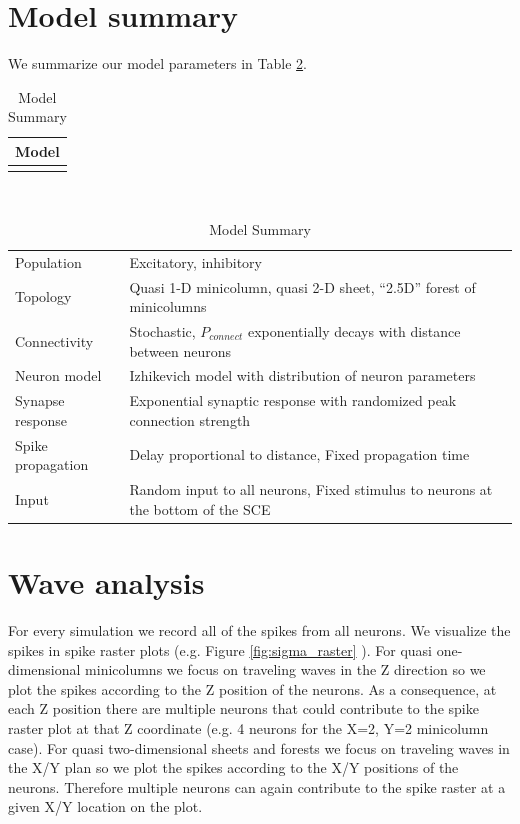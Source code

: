 \section{Model summary}
We summarize our model parameters in Table \ref{tab:all_params}. 
\begin{table}[!htb]
 \caption{Model Summary}
 \label{tab:all_params}
 \centering
 \begin{tabular}{c}
  \textbf{Model} \\
  \hline \\
 \end{tabular} \\
 \begin{tabular}{ll}
  Population & Excitatory, inhibitory \\
  Topology & Quasi 1-D minicolumn, quasi 2-D sheet, ``2.5D'' forest of minicolumns \\
  Connectivity & Stochastic, $P_{connect}$ exponentially decays with distance between neurons \\
  Neuron model & Izhikevich model with distribution of neuron parameters \\
  Synapse response & Exponential synaptic response with randomized peak connection strength  \\
  Spike propagation & Delay proportional to distance, Fixed propagation time \\
  Input & Random input to all neurons, Fixed stimulus to neurons at the bottom of the SCE \\
 \end{tabular}
\end{table}

\section{Wave analysis}
For every simulation we record all of the spikes from all neurons. 
We visualize the spikes in spike raster plots (e.g. Figure \ref{fig:sigma_raster} ).
For quasi one-dimensional minicolumns we focus on traveling waves in the Z direction so we plot the spikes according to the Z position of the neurons.
As a consequence, at each Z position there are multiple neurons that could contribute to the spike raster plot at that Z coordinate (e.g. 4 neurons for the X=2, Y=2 minicolumn case).
For quasi two-dimensional sheets and forests we focus on traveling waves in the X/Y plan so we plot the spikes according to the X/Y positions of the neurons.
Therefore multiple neurons can again contribute to the spike raster at a given X/Y location on the plot.

